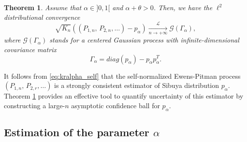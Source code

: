 \documentclass[twoside,12pt]{article}
\newcommand{\cL}{\mathcal{L}}
\newtheorem{thm}{Theorem}[section]
\begin{document}
\begin{thm}\label{main_teo}
Assume that $\alpha\in]0,1[$ and $\alpha+\theta>0$. Then, we have the $\ell^{2}$ distributional convergence
\begin{equation}\label{eq:gaussproc}
\sqrt{K_{n}}((P_{1,n},\,P_{2,n},\ldots)-p_{\alpha})\underset{n\rightarrow+\infty}{\overset{\cL}{\longrightarrow}}\mathcal{G}(\Gamma_\alpha),
\end{equation}
where $\mathcal{G}(\Gamma_\alpha)$ stands for a centered Gaussian process with infinite-dimensional covariance matrix 
\begin{equation}
\label{DEFGamma}
\Gamma_\alpha=diag(p_{\alpha}) - p_{\alpha} p_{\alpha}^T.
\end{equation} 
\end{thm}

It follows from \eqref{eq:kralpha_self} that the self-normalized Ewens-Pitman process $(P_{1,n},\,P_{2,r},\ldots)$ is a strongly consistent estimator of Sibuya distribution $p_{\alpha}$. Theorem \ref{main_teo} provides an effective tool to quantify uncertainty of this estimator by constructing a large-$n$ asymptotic confidence ball for $p_{\alpha}$.

\subsection{Estimation of the parameter $\alpha$}
\end{document}
